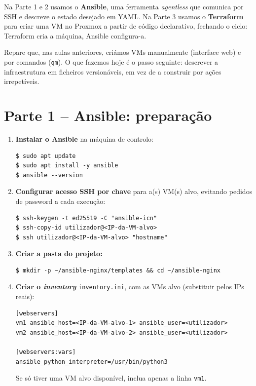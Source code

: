 \documentclass[11pt,a4paper]{article}
\begin{document}
Na Parte 1 e 2 usamos o \textbf{Ansible}, uma ferramenta \emph{agentless} que comunica por SSH e descreve o estado desejado em YAML. Na Parte 3 usamos o \textbf{Terraform} para criar uma VM no Proxmox a partir de código declarativo, fechando o ciclo: Terraform cria a máquina, Ansible configura-a.

Repare que, nas aulas anteriores, criámos VMs manualmente (interface web) e por comandos (\texttt{qm}). O que fazemos hoje é o passo seguinte: descrever a infraestrutura em ficheiros versionáveis, em vez de a construir por ações irrepetíveis.

\section{Parte 1 -- Ansible: preparação}
\begin{enumerate}[label=\arabic*.]

  \item \textbf{Instalar o Ansible} na máquina de controlo:
\begin{lstlisting}
$ sudo apt update
$ sudo apt install -y ansible
$ ansible --version
\end{lstlisting}

  \item \textbf{Configurar acesso SSH por chave} para a(s) VM(s) alvo, evitando pedidos de password a cada execução:
\begin{lstlisting}
$ ssh-keygen -t ed25519 -C "ansible-icn"
$ ssh-copy-id utilizador@<IP-da-VM-alvo>
$ ssh utilizador@<IP-da-VM-alvo> "hostname"
\end{lstlisting}

  \item \textbf{Criar a pasta do projeto:}
\begin{lstlisting}
$ mkdir -p ~/ansible-nginx/templates && cd ~/ansible-nginx
\end{lstlisting}

  \item \textbf{Criar o \emph{inventory}} \texttt{inventory.ini}, com as VMs alvo (substituir pelos IPs reais):
\begin{lstlisting}
[webservers]
vm1 ansible_host=<IP-da-VM-alvo-1> ansible_user=<utilizador>
vm2 ansible_host=<IP-da-VM-alvo-2> ansible_user=<utilizador>

[webservers:vars]
ansible_python_interpreter=/usr/bin/python3
\end{lstlisting}
  Se só tiver uma VM alvo disponível, inclua apenas a linha \texttt{vm1}.


\end{enumerate}
\end{document}
